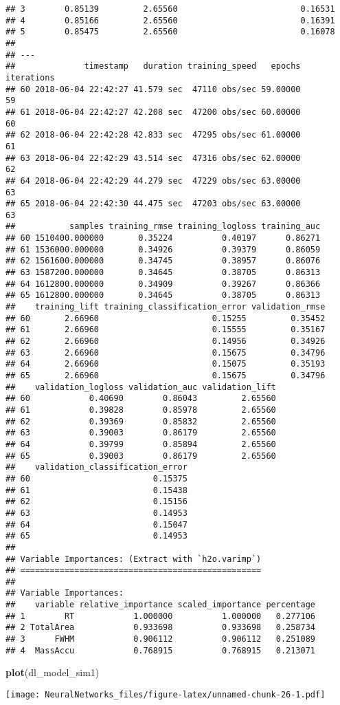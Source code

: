\documentclass[]{article}
\newenvironment{Shaded}{\begin{snugshade}}{\end{snugshade}}
\newcommand{\KeywordTok}[1]{\textcolor[rgb]{0.13,0.29,0.53}{\textbf{#1}}}
\newcommand{\NormalTok}[1]{#1}
\begin{document}
\begin{verbatim}
## 3        0.85139         2.65560                         0.16531
## 4        0.85166         2.65560                         0.16391
## 5        0.85475         2.65560                         0.16078
## 
## ---
##              timestamp   duration training_speed   epochs iterations
## 60 2018-06-04 22:42:27 41.579 sec  47110 obs/sec 59.00000         59
## 61 2018-06-04 22:42:27 42.208 sec  47200 obs/sec 60.00000         60
## 62 2018-06-04 22:42:28 42.833 sec  47295 obs/sec 61.00000         61
## 63 2018-06-04 22:42:29 43.514 sec  47316 obs/sec 62.00000         62
## 64 2018-06-04 22:42:29 44.279 sec  47229 obs/sec 63.00000         63
## 65 2018-06-04 22:42:30 44.475 sec  47203 obs/sec 63.00000         63
##           samples training_rmse training_logloss training_auc
## 60 1510400.000000       0.35224          0.40197      0.86271
## 61 1536000.000000       0.34926          0.39379      0.86059
## 62 1561600.000000       0.34745          0.38957      0.86076
## 63 1587200.000000       0.34645          0.38705      0.86313
## 64 1612800.000000       0.34909          0.39267      0.86366
## 65 1612800.000000       0.34645          0.38705      0.86313
##    training_lift training_classification_error validation_rmse
## 60       2.66960                       0.15255         0.35452
## 61       2.66960                       0.15555         0.35167
## 62       2.66960                       0.14956         0.34926
## 63       2.66960                       0.15675         0.34796
## 64       2.66960                       0.15075         0.35193
## 65       2.66960                       0.15675         0.34796
##    validation_logloss validation_auc validation_lift
## 60            0.40690        0.86043         2.65560
## 61            0.39828        0.85978         2.65560
## 62            0.39369        0.85832         2.65560
## 63            0.39003        0.86179         2.65560
## 64            0.39799        0.85894         2.65560
## 65            0.39003        0.86179         2.65560
##    validation_classification_error
## 60                         0.15375
## 61                         0.15438
## 62                         0.15156
## 63                         0.14953
## 64                         0.15047
## 65                         0.14953
## 
## Variable Importances: (Extract with `h2o.varimp`) 
## =================================================
## 
## Variable Importances: 
##    variable relative_importance scaled_importance percentage
## 1        RT            1.000000          1.000000   0.277106
## 2 TotalArea            0.933698          0.933698   0.258734
## 3      FWHM            0.906112          0.906112   0.251089
## 4  MassAccu            0.768915          0.768915   0.213071
\end{verbatim}

\begin{Shaded}
\begin{Highlighting}[]
\KeywordTok{plot}\NormalTok{(dl_model_sim1)}
\end{Highlighting}
\end{Shaded}

\texttt{[image: NeuralNetworks\_files/figure-latex/unnamed-chunk-26-1.pdf]}
\end{document}
